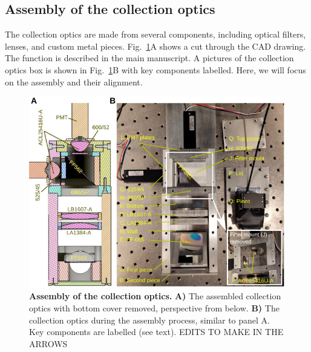 \documentclass[10pt,letterpaper]{article}
\begin{document}
\subsection{Assembly of the collection optics}
%
The collection optics are made from several components, including optical filters, lenses, and custom metal pieces. Fig.~\ref{sfig9}A shows a cut through the CAD drawing. The function is described in the main manuscript. A pictures of the collection optics box is shown in Fig.~\ref{sfig9}B with key components labelled. Here, we will focus on the assembly and their alignment.
%
\begin{figure}[h]
    \includegraphics[width=\textwidth]{sfig9.jpg}
    \caption{{\bf Assembly of the collection optics.} \textbf{A)} The assembled collection optics with bottom cover removed, perspective from below. \textbf{B)} The collection optics during the assembly process, similar to panel A. Key components are labelled (see text). EDITS TO MAKE IN THE ARROWS}
    \label{sfig9}
\end{figure}
%
\end{document}
